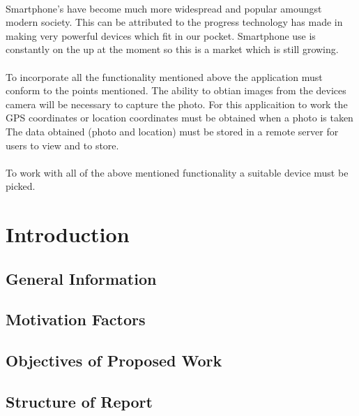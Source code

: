 \documentclass{article}
\begin{document}
\paragraph{}
\label{par:First Paragraph}

Smartphone's have become much more widespread and popular amoungst modern society. This can be attributed to the progress technology has made in making very powerful devices which fit in our pocket. Smartphone use is constantly on the up at the moment so this is a market which is still growing.

\paragraph{}
\label{par:Second Paragraph}

To incorporate all the functionality mentioned above the application must conform to the points mentioned.
The ability to obtian images from the devices camera will be necessary to capture the photo.
For this applicaition to work the GPS coordinates or location coordinates must be obtained when a photo is taken
The data obtained (photo and location) must be stored in a remote server for users to view and to store.

\paragraph{}
\label{par:Third Paragraph}
To work with all of the above mentioned functionality a suitable device must be picked.



\newpage


\label{sec:Subsection}
\section{Introduction}
\subsection{General Information}
\subsection{Motivation Factors}
\subsection{Objectives of Proposed Work}
\subsection{Structure of Report}
\newpage
\end{document}
